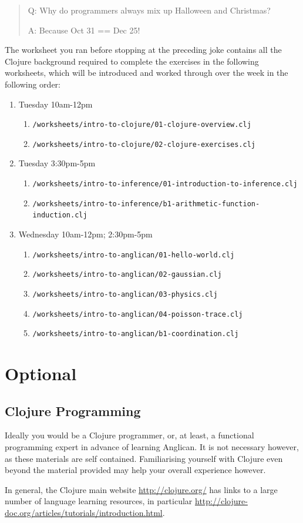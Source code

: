 \documentclass{article}
\begin{document}
\begin{quote}
Q: Why do programmers always mix up Halloween and Christmas?

A: Because Oct 31 == Dec 25!
\end{quote}
\newpage

The worksheet you ran before stopping at the preceding joke contains all the Clojure background required to
complete the exercises in the following worksheets, which will be introduced and worked through over the week in the following order:

\begin{enumerate}
\item Tuesday 10am-12pm
\begin{enumerate}
\item  \texttt{/worksheets/intro-to-clojure/01-clojure-overview.clj}
\item  \texttt{/worksheets/intro-to-clojure/02-clojure-exercises.clj}
\end{enumerate}
\item Tuesday 3:30pm-5pm
\begin{enumerate}
\item  \texttt{/worksheets/intro-to-inference/01-introduction-to-inference.clj}
\item  \texttt{/worksheets/intro-to-inference/b1-arithmetic-function-induction.clj}
\end{enumerate}
\item Wednesday 10am-12pm; 2:30pm-5pm
\begin{enumerate}
\item  \texttt{/worksheets/intro-to-anglican/01-hello-world.clj}
\item  \texttt{/worksheets/intro-to-anglican/02-gaussian.clj}		
\item  \texttt{/worksheets/intro-to-anglican/03-physics.clj}		
\item  \texttt{/worksheets/intro-to-anglican/04-poisson-trace.clj}
\item  \texttt{/worksheets/intro-to-anglican/b1-coordination.clj}
\end{enumerate}
\end{enumerate}


\section{Optional}


\subsection{Clojure Programming}

Ideally you would be a Clojure programmer, or, at least, a functional 
programming expert in advance of learning Anglican.  It is not necessary however, as these
materials are self contained.  Familiarising yourself
with Clojure even beyond the material provided may help your overall experience however. 

In general, the Clojure main website
\url{http://clojure.org/} has links to a large number of language 
learning resources, in particular \url{http://clojure-doc.org/articles/tutorials/introduction.html}.

  
%
\end{document}
